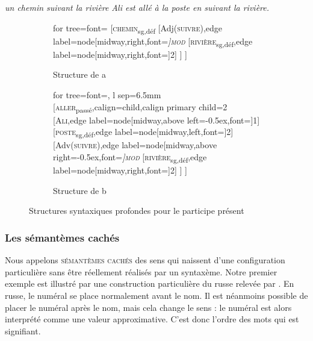 \ea\label{ex:13-suivant}  
\ea \textit{un chemin suivant la rivière}
\ex \textit{Ali est allé à la poste en suivant la rivière.}\z\z

\begin{figure}
	\begin{subfigure}[b]{0.5\textwidth}
		\centering
		\begin{forest} for tree={font=\normalfont}
			[\textsc{chemin}\textsubscript{sg,déf}
			[Adj(\textsc{suivre}),edge label={node[midway,right,font=\footnotesize\itshape]{\textsc{mod}}}
			[\textsc{rivière}\textsubscript{sg,déf},edge label={node[midway,right,font=\footnotesize]{2}}]
			]
			]
		\end{forest}
		\caption{Structure de a}
	\end{subfigure}%
	\hfill
	\begin{subfigure}[b]{0.5\textwidth}
		\centering
		\begin{forest} for tree={font=\normalfont, l sep=6.5mm}
			[\textsc{aller}\textsubscript{passé},calign=child,calign primary child=2
				[\textsc{Ali},edge label={node[midway,above left=-0.5ex,font=\footnotesize]{1}}]
				[\textsc{poste}\textsubscript{sg,déf},edge label={node[midway,left,font=\footnotesize]{2}}]
				[Adv(\textsc{suivre}),edge label={node[midway,above right=-0.5ex,font=\footnotesize\itshape]{\textsc{mod}}}
					[\textsc{rivière}\textsubscript{sg,déf},edge label={node[midway,right,font=\footnotesize]{2}}]
				]
			]
		\end{forest}
		\caption{Structure de b}
	\end{subfigure}
\caption{Structures syntaxiques profondes pour le participe présent\label{fig:13-suivant}}
\end{figure}

\subsubsection{Les sémantèmes cachés}\label{sec:13-cache}
Nous appelons \textsc{sémantèmes cachés} des sens qui naissent d’une configuration particulière sans être réellement réalisés par un syntaxème. Notre premier exemple est illustré par une construction particulière du russe relevée par \citet[141]{melcuk1988dependency}. En russe, le numéral se place normalement avant le nom. Il est néanmoins possible de placer le numéral après le nom, mais cela change le sens : le numéral est alors interprété comme une valeur approximative. C’est donc l’ordre des mots qui est signifiant. 

